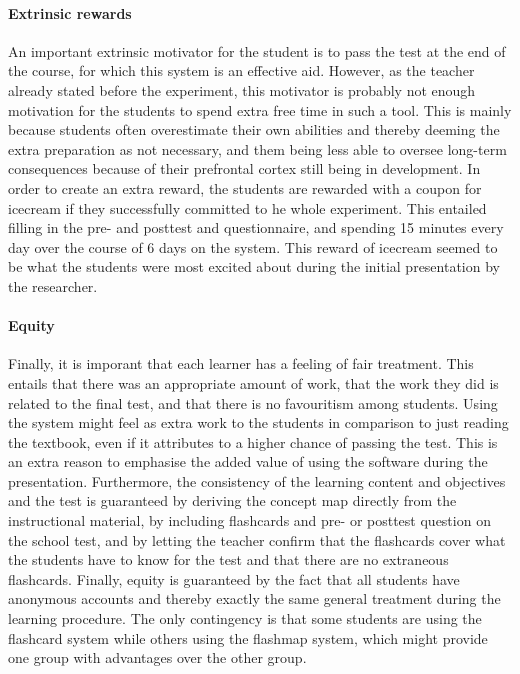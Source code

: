 \paragraph{Extrinsic rewards} An important extrinsic motivator for the student is to pass the test at the end of the course, for which this system is an effective aid. However, as the teacher already stated before the experiment, this motivator is probably not enough motivation for the students to spend extra free time in such a tool. This is mainly because students often overestimate their own abilities and thereby deeming the extra preparation as not necessary, and them being less able to oversee long-term consequences because of their prefrontal cortex still being in development. In order to create an extra reward, the students are rewarded with a coupon for icecream if they successfully committed to he whole experiment. This entailed filling in the pre- and posttest and questionnaire, and spending 15 minutes every day over the course of 6 days on the system. This reward of icecream seemed to be what the students were most excited about during the initial presentation by the researcher.

\paragraph{Equity} Finally, it is imporant that each learner has a feeling of fair treatment. This entails that there was an appropriate amount of work, that the work they did is related to the final test, and that there is no favouritism among students. Using the system might feel as extra work to the students in comparison to just reading the textbook, even if it attributes to a higher chance of passing the test. This is an extra reason to emphasise the added value of using the software during the presentation. Furthermore, the consistency of the learning content and objectives and the test is guaranteed by deriving the concept map directly from the instructional material, by including flashcards and pre- or posttest question on the school test, and by letting the teacher confirm that the flashcards cover what the students have to know for the test and that there are no extraneous flashcards. Finally, equity is guaranteed by the fact that all students have anonymous accounts and thereby exactly the same general treatment during the learning procedure. The only contingency is that some students are using the flashcard system while others using the flashmap system, which might provide one group with advantages over the other group.
